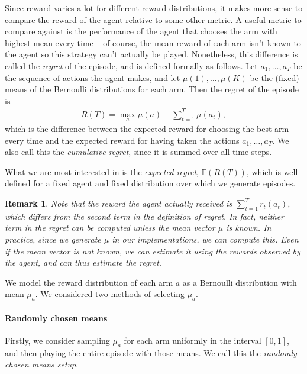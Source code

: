 \documentclass[10pt]{article}
\newtheorem{remark}{Remark}
\newcommand{\EE}{\mathbb{E}}
\begin{document}
Since reward varies a lot for different reward distributions, it makes more
sense to compare the reward of the agent relative to some other metric. A useful
metric to compare against is the performance of the agent that chooses the
arm with highest mean every time -- of course, the mean reward of each arm isn't
known to the agent so this strategy can't actually be played. Nonetheless, this
difference is called the \emph{regret} of the episode, and is defined formally
as follows. Let $a_1, \ldots, a_T$ be the sequence of actions the agent makes,
and let $\mu(1), \ldots, \mu(K)$ be the (fixed) means of the Bernoulli
distributions for each arm. Then the regret of the episode is
\begin{align*}
    R(T) = \max_a \mu(a) - \sum_{t=1}^T \mu(a_t),
\end{align*}
which is the difference between the expected reward for choosing the best arm
every time and the expected reward for having taken the actions $a_1, \ldots,
a_T$. We also call this the \emph{cumulative regret}, since it is summed over
all time steps.

What we are most interested in is the \emph{expected regret}, $\EE(R(T))$, which
is well-defined for a fixed agent and fixed distribution over which we generate
episodes.

\begin{remark}
    Note that the reward the agent actually received is $\sum_{t=1}^T r_t(a_t)$,
    which differs from the second term in the definition of regret. In fact,
    neither term in the regret can be computed unless the mean vector $\mu$ is
    known. In practice, since we generate $\mu$ in our implementations, we can
    compute this.  Even if the mean vector is not known, we can estimate it
    using the rewards observed by the agent, and can thus estimate the regret.
\end{remark}

We model the reward distribution of each arm $a$ as a Bernoulli distribution
with mean $\mu_a$. We considered two methods of selecting $\mu_a$.

\paragraph{Randomly chosen means}
Firstly, we consider sampling $\mu_a$ for each arm uniformly in the interval
$[0,1]$, and then playing the entire episode with those means. We call this the
\emph{randomly chosen means setup}.
\end{document}
